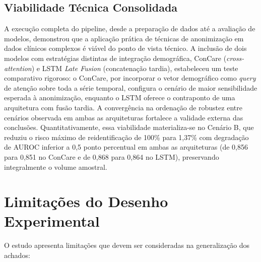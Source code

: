 \subsection{Viabilidade Técnica Consolidada}

A execução completa do pipeline, desde a preparação de dados até a avaliação de modelos, demonstrou que a aplicação prática de técnicas de anonimização em dados clínicos complexos é viável do ponto de vista técnico. A inclusão de dois modelos com estratégias distintas de integração demográfica, ConCare (\textit{cross-attention}) e LSTM \textit{Late Fusion} (concatenação tardia), estabeleceu um teste comparativo rigoroso: o ConCare, por incorporar o vetor demográfico como \textit{query} de atenção sobre toda a série temporal, configura o cenário de maior sensibilidade esperada à anonimização, enquanto o LSTM oferece o contraponto de uma arquitetura com fusão tardia. A convergência na ordenação de robustez entre cenários observada em ambas as arquiteturas fortalece a validade externa das conclusões. Quantitativamente, essa viabilidade materializa-se no Cenário B, que reduziu o risco máximo de reidentificação de 100\% para 1,37\% com degradação de AUROC inferior a 0,5 ponto percentual em ambas as arquiteturas (de 0,856 para 0,851 no ConCare e de 0,868 para 0,864 no LSTM), preservando integralmente o volume amostral.

\section{Limitações do Desenho Experimental}
\label{sec:conclusao-limitacoes}

O estudo apresenta limitações que devem ser consideradas na generalização dos achados:

